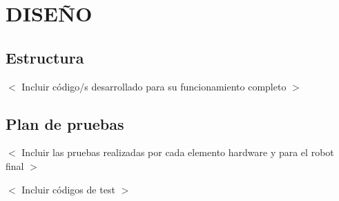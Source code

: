 
\chapter{DISEÑO}


\section{Estructura}
$<$ Incluir código/s desarrollado para su funcionamiento completo $>$

\section{Plan de pruebas}

$<$ Incluir las pruebas realizadas por cada elemento hardware y para el robot final $>$

$<$ Incluir códigos de test $>$
